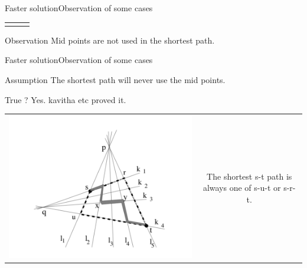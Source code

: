 \documentclass{beamer}
\begin{document}
\begin{frame}{Faster solution}{Observation of some cases}
\begin{tabular}{c c c}
\begin{minipage}{0.3\textwidth}
        \end{minipage} 
    \end{tabular}
    \begin{block}{Observation}
        Mid points are not used in the shortest path.
    \end{block}
\end{frame}

\begin{frame}{Faster solution}{Observation of some cases}
    \begin{block}{Assumption}
        The shortest path will never use the mid points. 
    \end{block}
    True ? Yes. kavitha etc \cite{kavitha2003shortest} proved it.
    \begin{tabular}{c c}
        \begin{minipage}{0.4\textwidth}
            \includegraphics[width=\linewidth]{sut.png}
        \end{minipage}  
        &  
        \begin{minipage}{0.5\textwidth}
            \begin{theorem}
                The shortest s-t path is always one of s-u-t or s-r-t. 
            \end{theorem}
        \end{minipage} 
    \end{tabular}
    
\end{frame}
\end{document}
